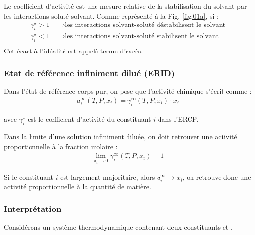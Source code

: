 \documentclass[a4paper]{book}
\begin{document}
Le coefficient d'activité est une mesure relative de la stabilisation du solvant par les interactions soluté-solvant. Comme représenté à la Fig. \ref{fig:01a}, si : 
\begin{align*}
\gamma_i^\star > 1 &\implies \text{les interactions solvant-soluté déstabilisent le solvant} \\
\gamma_i^\star < 1 &\implies \text{les interactions solvant-soluté stabilisent le solvant} \\
\end{align*}
Cet écart à l'idéalité est appelé terme d'excès.

\subsubsection{Etat de référence infiniment dilué (ERID)}


Dans l'état de référence corps pur, on pose que l'activité chimique s'écrit comme : 
\begin{align*}
a_i^\infty (T, P, x_i) = \gamma_i^\infty (T, P, x_i) \cdot x_i
\end{align*}

avec $\gamma_i^\star$ est le c{\oe}fficient d'activité du constituant $i$ dans l'ERCP.

Dans la limite d'une solution infiniment diluée, on doit retrouver une activité proportionnelle à la fraction molaire :
\begin{align*}
\lim_{x_i \to 0} \gamma_i^\infty (T, P, x_i) = 1
\end{align*}

Si le constituant $i$ est largement majoritaire, alors $a^\infty_i \to x_i$, on retrouve donc une activité proportionnelle à la quantité de matière.

\subsubsection{Interprétation}

Considérons un système thermodynamique contenant deux constituants  et .
\end{document}

